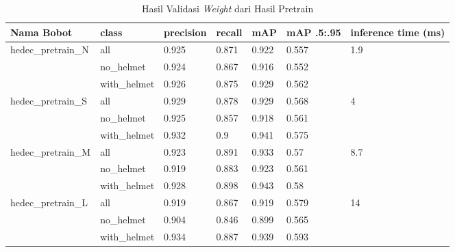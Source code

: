 \begin{longtable}{|l|l|l|l|l|l|l|} 
  \caption{Hasil Validasi \emph{Weight} dari Hasil Pretrain}
  \label{tb:pretraincoco}\\
  \hline
  Nama Bobot                          & class        & precision & recall & mAP   & mAP .5:.95 & inference time (ms)    \\ 
  \hline
  \multirow{3}{*}{hedec\_pretrain\_N} & all          & 0.925     & 0.871  & 0.922 & 0.557      & \multirow{3}{*}{1.9}   \\
                                      & no\_helmet   & 0.924     & 0.867  & 0.916 & 0.552      &                        \\
                                      & with\_helmet & 0.926     & 0.875  & 0.929 & 0.562      &                        \\ 
  \hline
  \multirow{3}{*}{hedec\_pretrain\_S} & all          & 0.929     & 0.878  & 0.929 & 0.568      & \multirow{3}{*}{4}     \\
                                      & no\_helmet   & 0.925     & 0.857  & 0.918 & 0.561      &                        \\
                                      & with\_helmet & 0.932     & 0.9    & 0.941 & 0.575      &                        \\ 
  \hline
  \multirow{3}{*}{hedec\_pretrain\_M} & all          & 0.923     & 0.891  & 0.933 & 0.57       & \multirow{3}{*}{8.7}   \\
                                      & no\_helmet   & 0.919     & 0.883  & 0.923 & 0.561      &                        \\
                                      & with\_helmet & 0.928     & 0.898  & 0.943 & 0.58       &                        \\ 
  \hline
  \multirow{3}{*}{hedec\_pretrain\_L} & all          & 0.919     & 0.867  & 0.919 & 0.579      & \multirow{3}{*}{14}    \\
                                      & no\_helmet   & 0.904     & 0.846  & 0.899 & 0.565      &                        \\
                                      & with\_helmet & 0.934     & 0.887  & 0.939 & 0.593      &                        \\ 
  \hline
\end{longtable}

